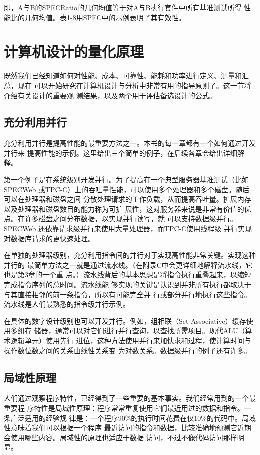 即，A与B的SPECRatio的几何均值等于对A与B执行套件中所有基准测试所得
性能比的几何均值。表1-8用SPEC中的示例表明了其有效性。


\section{计算机设计的量化原理}
既然我们已经知道如何对性能、成本、可靠性、能耗和功率进行定义、测量和汇总，现在
可以开始研究在计算机设计与分析中非常有用的指导原则了。这一节将介绍有关设计的重要观
测结果，以及两个用于评估备选设计的公式。

\subsection{充分利用并行}
充分利用并行是提高性能的最重要方法之一。本书的每一章都有一个如何通过开发并行来
提高性能的示例。这里给出三个简单的例子，在后续各章会给出详细解释。

第一个例子是在系统级别开发并行。为了提高在一个典型服务器基准测试（比如SPECWeb
或TPC-C）上的吞吐量性能，可以使用多个处理器和多个磁盘。随后可以在处理器和磁盘之间
分散处理请求的工作负载，从而提高吞吐量。扩展内存以及处理器和磁盘数目的能力称为可扩
展性，这对服务器来说是非常有价值的优点。在许多磁盘之间分布数据，以实现并行读写，就
可以支持数据级并行。SPECWeb 还依靠请求级并行来使用大量处理器，而TPC-C使用线程级
并行实现对数据库请求的更快速处理。

在单独的处理器级别，充分利用指令间的并行对于实现高性能非常关键。实现这种并行的
最简单方法之一就是通过流水线。（在附录C中会更详细地解释流水线，它也是第3章的一个重
点。）流水线背后的基本思想是将指令执行重叠起来，以缩短完成指令序列的总时间。流水线能
够实现的关键是认识到并非所有执行都取决于与其直接相邻的前一条指令，所以有可能完全并
行或部分并行地执行这些指令。流水线是人们最熟悉的指令级并行示例。

在具体的数字设计级别也可以开发并行。例如，组相联（Set Associative）缓存使用多组存
储器，通常可以对它们进行并行查询，以查找所需项目。现代ALU（算术逻辑单元）使用先行
进位，这种方法使用并行来加快求和过程，使计算时间与操作数位数之间的关系由线性关系变
为对数关系。数据级并行的例子还有许多。

\subsection{局域性原理} \label{subsec:PrincipleOfLocality}

人们通过观察程序特性，已经得到了一些重要的基本事实。我们经常用到的一个最重要程
序特性是局域性原理：程序常常重复使用它们最近用过的数据和指令。一条广泛适用的经验规
律是：一个程序90\%的执行时间花费在仅10\%的代码中。局域性意味着我们可以根据一个程序
最近访问的指令和数据，比较准确地预测它近期会使用哪些内容。局域性的原理也适应于数据
访问，不过不像代码访问那样明显。

